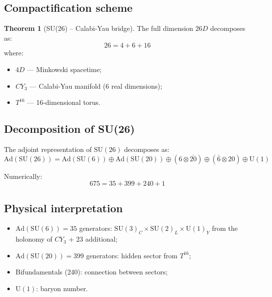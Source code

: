 \documentclass[12pt,a4paper,twoside]{article}
\newcommand{\SU}{\mathrm{SU}}
\newcommand{\Uone}{\mathrm{U}(1)}
\newcommand{\Ad}{\mathrm{Ad}}
\theoremstyle{definition}
\newtheorem{theorem}{Theorem}[section]
\begin{document}
\subsection{Compactification scheme}

\begin{theorem}[SU(26) -- Calabi-Yau bridge]
The full dimension $26D$ decomposes as:
\begin{equation}
\boxed{
26 = 4 + 6 + 16
}
\label{eq:compact}
\end{equation}
where:
\begin{itemize}
    \item $4D$ — Minkowski spacetime;
    \item $CY_3$ — Calabi-Yau manifold (6 real dimensions);
    \item $T^{16}$ — 16-dimensional torus.
\end{itemize}
\end{theorem}

\subsection{Decomposition of SU(26)}

The adjoint representation of $\SU(26)$ decomposes as:
\begin{equation}
\Ad(\SU(26)) = \Ad(\SU(6)) \oplus \Ad(\SU(20)) \oplus (6 \otimes \bar{20}) \oplus (\bar{6} \otimes 20) \oplus \Uone
\label{eq:su26_decomp}
\end{equation}

Numerically:
\begin{equation}
\boxed{
675 = 35 + 399 + 240 + 1
}
\label{eq:su26_numbers}
\end{equation}

\subsection{Physical interpretation}

\begin{itemize}
    \item $\Ad(\SU(6)) = 35$ generators: $\SU(3)_C \times \SU(2)_L \times \Uone_Y$ from the holonomy of $CY_3$ + 23 additional;
    \item $\Ad(\SU(20)) = 399$ generators: hidden sector from $T^{16}$;
    \item Bifundamentals (240): connection between sectors;
    \item $\Uone$: baryon number.
\end{itemize}
\end{document}
